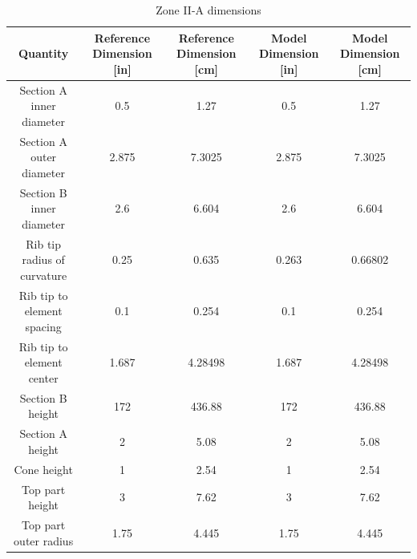 \begin{table}[htpb]
    \centering
    \caption{Zone II-A dimensions}
    \label{tab:zone-iia-specs}
    \begin{tabulary}{\linewidth}{|C|CC|CC|}
    \hline
    Quantity & Reference Dimension [in] & Reference Dimension [\unit{\centi\metre}] & Model Dimension [in] & Model Dimension [\unit{\centi\metre}]\\
    \hline
    Section A inner diameter & 0.5 & 1.27 & 0.5 & 1.27 \\
    \hline
    Section A outer diameter & 2.875 & 7.3025 & 2.875 & 7.3025 \\
    \hline
    Section B inner diameter & 2.6 & 6.604 & 2.6 & 6.604 \\
    \hline
    Rib tip radius of curvature & 0.25 & 0.635 & 0.263 & 0.66802\\
    \hline
    Rib tip to element spacing & 0.1 & 0.254 & 0.1 & 0.254\\
    \hline
    Rib tip to element center & 1.687 & 4.28498 & 1.687 & 4.28498\\
    \hline
    Section B height & 172 & 436.88 & 172 & 436.88\\
    \hline
    Section A height & 2 & 5.08 & 2 & 5.08 \\
    \hline
    Cone height & 1 & 2.54 & 1 & 2.54 \\
    \hline
    Top part height & 3 & 7.62 & 3 & 7.62 \\
    \hline
    Top part outer radius & 1.75 & 4.445 & 1.75 & 4.445 \\
    \hline
    \end{tabulary}
\end{table}


